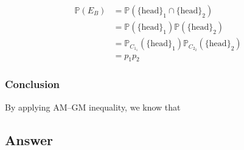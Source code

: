 \documentclass[12pt]{article}
\newcommand{\bP}{\mathbb{P}}
\begin{document}
\begin{enumerate}[label={},leftmargin=0in]
			\[
			\begin{aligned}
				\bP(E_B) &= \bP(\{\mathrm{head}\}_1\cap \{\mathrm{head}\}_2)\\
				&= \bP(\{\mathrm{head}\}_1)\bP(\{\mathrm{head}\}_2)\\
				&= \bP_{C_{1_1}}(\{\mathrm{head}\}_1)\bP_{C_{2_2}}(\{\mathrm{head}\}_2)\\
				&= p_1p_2
			\end{aligned}
			\]
			
			\subsubsection*{Conclusion}
			
			By applying AM–GM inequality, we know that
			
			
			
		\subsection*{Answer}
		
			\[\boxed{}\]
	
	\end{enumerate}
\end{document}
